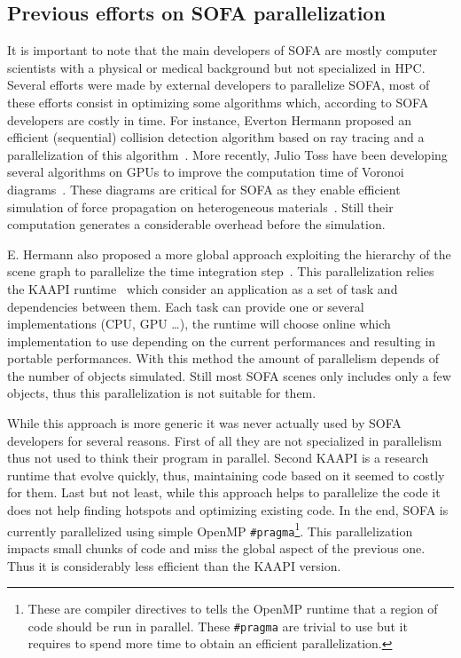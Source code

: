 \subsection{Previous efforts on SOFA parallelization}

It is important to note that the main developers of \gls{SOFA} are  mostly computer scientists with a physical or medical background but not specialized in \gls{HPC}.
Several efforts were made by external developers to parallelize \gls{SOFA}, most of these efforts consist in optimizing some algorithms which, according to \gls{SOFA} developers are costly in time.
For instance, Everton Hermann proposed an efficient (sequential) collision detection algorithm based on ray tracing and a parallelization of this algorithm~\cite{Hermann08Raytraced}.
More recently, Julio Toss have been developing several algorithms on \glspl{GPU} to improve the computation time of Voronoi diagrams~\cite{Toss13Parallel,Toss14Parallel}.
These diagrams are critical for \gls{SOFA} as they enable efficient simulation of force propagation on heterogeneous materials~\cite{Faure11Sparse}.
Still their computation generates a considerable overhead before the simulation.

E. Hermann also proposed a more global approach exploiting the hierarchy of the scene graph to parallelize the time integration step~\cite{Hermann09Interactive}.
This parallelization relies the \gls{KAAPI} runtime~\cite{Gautier07KAAPI} which consider an application as a set of task and dependencies between them.
Each task can provide one or several implementations (\gls{CPU}, \gls{GPU} \ldots), the runtime will choose online which implementation to use depending on the current performances and resulting in portable performances.
With this method the amount of parallelism depends of the number of objects simulated.
Still most \gls{SOFA} scenes only includes only a few objects, thus this parallelization is not suitable for them.


While this approach is more generic it was never actually used by \gls{SOFA} developers for several reasons.
First of all they are not specialized in parallelism thus not used to think their program in parallel.
Second \gls{KAAPI} is a research runtime that evolve quickly, thus, maintaining code based on it seemed to costly for them.
Last but not least, while this approach helps to parallelize the code it does not help finding hotspots and optimizing existing code.
In the end, \gls{SOFA} is currently parallelized using simple \gls{OpenMP} \texttt{\#pragma}\footnote{
    These are compiler directives to tells the \gls{OpenMP} runtime that a region of code should be run in parallel.
    These \texttt{\#pragma} are trivial to use but it requires to spend more time to obtain an efficient parallelization.}.
This parallelization impacts small chunks of code and miss the global aspect of the previous one.
Thus it is considerably less efficient than the \gls{KAAPI} version.


